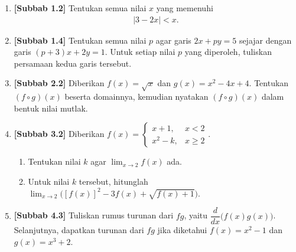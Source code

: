 \documentclass[10pt,openany,a4paper]{article}
\theoremstyle{definition}
\theoremstyle{definition}
\theoremstyle{plain}
\begin{document}
\newpage

\begin{enumerate}
    \item \textbf{[Subbab 1.2]} Tentukan semua nilai $x$ yang memenuhi
    \begin{align*}
        |3-2x|<x.
    \end{align*}

    \item \textbf{[Subbab 1.4]} Tentukan semua nilai $p$ agar garis $2x+py=5$ sejajar dengan garis $(p+3)x+2y=1$. Untuk setiap nilai $p$ yang diperoleh, tuliskan persamaan kedua garis tersebut.

    \item \textbf{[Subbab 2.2]} Diberikan $f(x)=\sqrt{x}$ dan $g(x)=x^2-4x+4$. Tentukan $(f\circ g)(x)$ beserta domainnya, kemudian nyatakan $(f\circ g)(x)$ dalam bentuk nilai mutlak.

    \item \textbf{[Subbab 3.2]} Diberikan $f(x)=\begin{cases}
        x+1, & x<2\\
        x^2-k, & x\geq 2
    \end{cases}$.
    \begin{enumerate}
        \item Tentukan nilai $k$ agar $\displaystyle\lim_{x\to 2}f(x)$ ada.
        \item Untuk nilai $k$ tersebut, hitunglah $\displaystyle\lim_{x\to 2}\Big([f(x)]^2-3f(x)+\sqrt{f(x)+1}\Big)$.
    \end{enumerate}

    \item \textbf{[Subbab 4.3]} Tuliskan rumus turunan dari $fg$, yaitu $\dfrac{d}{dx}\big(f(x)g(x)\big)$.\\
    Selanjutnya, dapatkan turunan dari $fg$ jika diketahui $f(x)=x^2-1$ dan $g(x)=x^3+2$.
\end{enumerate}

\newpage
\end{document}

